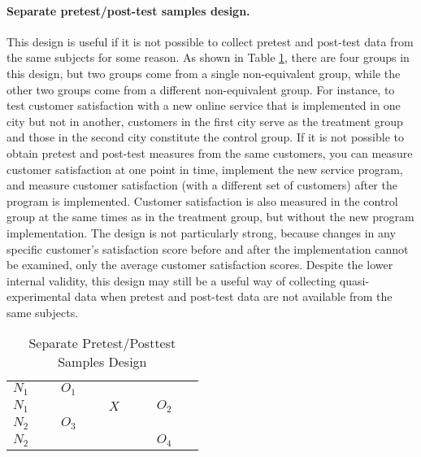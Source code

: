 \paragraph{Separate pretest/post-test samples design.} This design is useful if it is not possible to collect pretest and post-test data from the same subjects for some reason. As shown in Table \ref{09:tab12}, there are four groups in this design, but two groups come from a single non-equivalent group, while the other two groups come from a different non-equivalent group. For instance, to test customer satisfaction with a new online service that is implemented in one city but not in another, customers in the first city serve as the treatment group and those in the second city constitute the control group. If it is not possible to obtain pretest and post-test measures from the same customers, you can measure customer satisfaction at one point in time, implement the new service program, and measure customer satisfaction (with a different set of customers) after the program is implemented. Customer satisfaction is also measured in the control group at the same times as in the treatment group, but without the new program implementation. The design is not particularly strong, because changes in any specific customer's satisfaction score before and after the implementation cannot be examined, only the average customer satisfaction scores. Despite the lower internal validity, this design may still be a useful way of collecting quasi-experimental data when pretest and post-test data are not available from the same subjects.

\begin{table}[H]
	\centering
	\begin{tabularx}{0.65\linewidth}{p{0.15\linewidth}p{0.15\linewidth}p{0.15\linewidth}p{0.15\linewidth}}
		\toprule
		$ N_1 $ & $ O_1 $  &       &         \\
		$ N_1 $ &          & $ X $ & $ O_2 $ \\
		$ N_2 $ & $ O_3 $  &       &         \\
		$ N_2 $ &          &       & $ O_4 $ \\
		\bottomrule
	\end{tabularx}
	\caption{Separate Pretest/Posttest Samples Design}
	\label{09:tab12}
\end{table}

